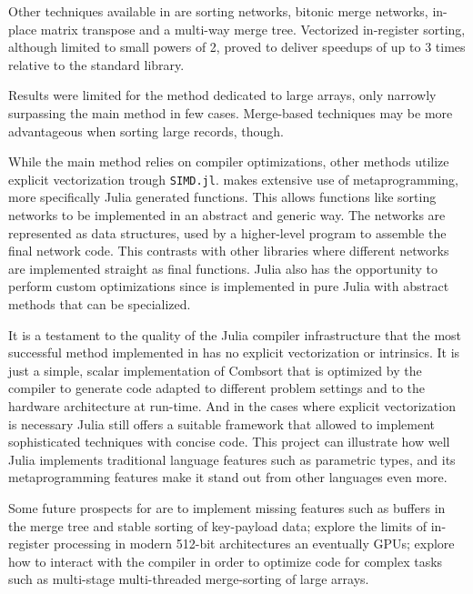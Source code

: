 \documentclass{juliacon}
\begin{document}
Other techniques available in \chipsort are sorting networks, bitonic merge networks, in-place matrix transpose and a multi-way merge tree. Vectorized in-register sorting, although limited to small powers of 2, proved to deliver speedups of up to 3 times relative to the standard library.

Results were limited for the method dedicated to large arrays, only narrowly surpassing the main \chipsort method in few cases. Merge-based techniques may be more advantageous when sorting large records, though.

While the main \chipsort method relies on compiler optimizations, other methods utilize explicit vectorization trough {\tt SIMD.jl}. \chipsort makes extensive use of metaprogramming, more specifically Julia generated functions. This allows functions like sorting networks to be implemented in an abstract and generic way. The networks are represented as data structures, used by a higher-level program to assemble the final network code. This contrasts with other libraries where different networks are implemented straight as final functions. Julia also has the opportunity to perform custom optimizations since \chipsort is implemented in pure Julia with abstract methods that can be specialized.

It is a testament to the quality of the Julia compiler infrastructure that the most successful method implemented in \chipsort has no explicit vectorization or intrinsics. It is just a simple, scalar implementation of Combsort that is optimized by the compiler to generate code adapted to different problem settings and to the hardware architecture at run-time. And in the cases where explicit vectorization is necessary Julia still offers a suitable framework that allowed \chipsort to implement sophisticated techniques with concise code. This project can illustrate how well Julia implements traditional language features such as parametric types, and its metaprogramming features make it stand out from other languages even more.

Some future prospects for \chipsort are to implement missing features such as buffers in the merge tree and stable sorting of key-payload data; explore the limits of in-register processing in modern 512-bit architectures an eventually GPUs; explore how to interact with the compiler in order to optimize code for complex tasks such as multi-stage multi-threaded merge-sorting of large arrays.





\end{document}
